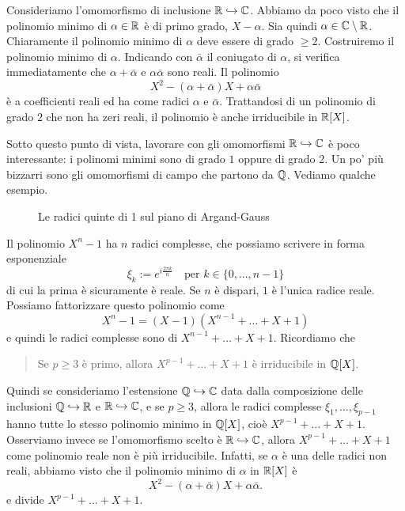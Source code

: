 \begin{esem}
Consideriamo l'omomorfismo di inclusione $\mathbb{R} \hookrightarrow \mathbb{C}$. Abbiamo da poco visto che il polinomio minimo di $\alpha \in \mathbb{R}$ è di primo grado, $X-\alpha$. Sia quindi $\alpha \in \mathbb{C} \setminus \mathbb{R}$. Chiaramente il polinomio minimo di $\alpha$ deve essere di grado $\ge 2$. Costruiremo il polinomio minimo di $\alpha$. Indicando con $\bar\alpha$ il coniugato di $\alpha$, si verifica immediatamente che $\alpha + \bar\alpha$ e $\alpha \bar\alpha$ sono reali. Il polinomio
\[X^2 - (\alpha + \bar\alpha)X + \alpha \bar\alpha\]
è a coefficienti reali ed ha come radici $\alpha$ e $\bar\alpha$. Trattandosi di un polinomio di grado $2$ che non ha zeri reali, il polinomio è anche irriducibile in $\mathbb{R}[X]$.
\end{esem}

Sotto questo punto di vista, lavorare con gli omomorfismi $\mathbb{R} \hookrightarrow \mathbb{C}$ è poco interessante: i polinomi minimi sono di grado $1$ oppure di grado $2$. Un po' più bizzarri sono gli omomorfismi di campo che partono da $\mathbb{Q}$. Vediamo qualche esempio.

\begin{figure}
\centering

\caption{Le radici quinte di 1 sul piano di Argand-Gauss}
\end{figure}

\begin{esem}
Il polinomio $X^n-1$ ha $n$ radici complesse, che possiamo scrivere in forma esponenziale
\[\xi_k := e^{i\frac{2\pi k}n} \quad \text{per } k \in \{0, \dots{}, n-1\}\]
di cui la prima è sicuramente è reale. Se $n$ è dispari, $1$ è l'unica radice reale. Possiamo fattorizzare questo polinomio come
\[X^n - 1 = (X-1) \left(X^{n-1} + \dots{} + X + 1\right)\]
e quindi le radici complesse sono di $X^{n-1} + \dots{} + X + 1$. Ricordiamo che
\begin{quotation}
Se $p \ge 3$ è primo, allora $X^{p-1} + \dots{} + X + 1$ è irriducibile in $\mathbb{Q}[X]$.
\end{quotation}
Quindi se consideriamo l'estensione $\mathbb{Q} \hookrightarrow \mathbb{C}$ data dalla composizione delle inclusioni $\mathbb{Q} \hookrightarrow \mathbb{R}$ e $\mathbb{R} \hookrightarrow \mathbb{C}$, e se $p \ge 3$, allora le radici complesse $\xi_1, \dots{}, \xi_{p-1}$ hanno tutte lo stesso polinomio minimo in $\mathbb{Q}[X]$, cioè $X^{p-1} + \dots{} + X + 1$. Osserviamo invece se l'omomorfismo scelto è $\mathbb{R} \hookrightarrow \mathbb{C}$, allora $X^{p-1} + \dots{} + X + 1$ come polinomio reale non è più irriducibile. Infatti, se $\alpha$ è una delle radici non reali, abbiamo visto che il polinomio minimo di $\alpha$ in $\mathbb{R}[X]$ è
\[X^2 - (\alpha + \bar\alpha)X + \alpha \bar\alpha .\]
e divide $X^{p-1} + \dots{} + X + 1$.
\end{esem}


